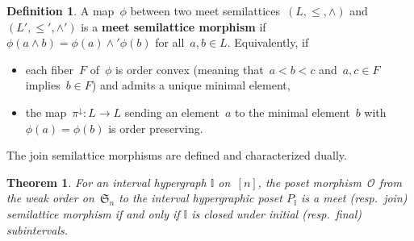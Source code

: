 \documentclass{amsart}
\newtheorem{theoremA}{Theorem}
\theoremstyle{definition}
\newtheorem{definition}[theorem]{Definition}
\newcommand{\defn}[1]{\textbf{\textsf{\color{PineGreen} #1}}} %
\newcommand{\fS}{\mathfrak{S}} %
\newcommand{\meet}{\wedge} %
\newcommand{\join}{\vee} %
\newcommand{\projDown}{\pi^\downarrow} %
\newcommand{\projUp}{\pi^\uparrow} %
\newcommand{\Or}{\mathcal O}  %
\newcommand{\II}{\mathbb I} %
\begin{document}

\begin{definition}
A map~$\phi$ between two meet semilattices~$(L, \le, \meet)$ and~$(L', \le', \meet')$ is a \defn{meet semilattice morphism} if~$\phi(a \meet b) = \phi(a) \meet' \phi(b)$ for all~$a,b \in L$.
Equivalently, if
\begin{itemize}
\item each fiber~$F$ of~$\phi$ is order convex (meaning that~$a < b < c$ and~$a,c \in F$ implies~$b \in F$) and admits a unique minimal element,
\item the map~$\projDown : L \to L$ sending an element~$a$ to the minimal element~$b$ with~$\phi(a) = \phi(b)$ is order preserving.
\end{itemize}
The join semilattice morphisms are defined and characterized dually.
\end{definition}

\begin{theoremA}
For an interval hypergraph $\II$ on~$[n]$, the poset morphism~$\Or$ from the weak order on~$\fS_n$ to the interval hypergraphic poset $P_\II$ is a meet (resp.~join) semilattice morphism if and only if $\II$ is closed under initial (resp.~final) subintervals.
\end{theoremA}
\end{document}
